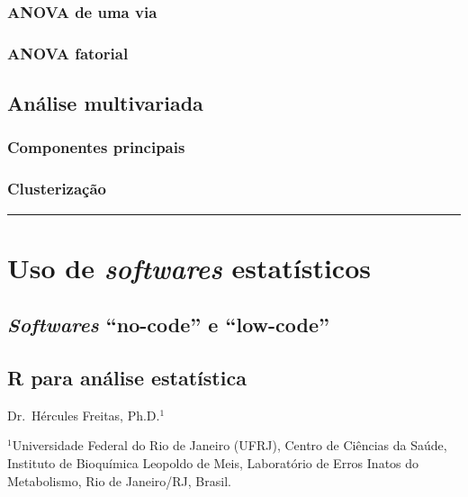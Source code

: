 \documentclass[
]{book}
\begin{document}
\subsection{ANOVA de uma via}\label{anova-de-uma-via}

\subsection{ANOVA fatorial}\label{anova-fatorial}

\section{Análise multivariada}\label{anuxe1lise-multivariada}

\subsection{Componentes principais}\label{componentes-principais}

\subsection{Clusterização}\label{clusterizauxe7uxe3o}

\begin{center}\rule{0.5\linewidth}{0.5pt}\end{center}

\chapter{\texorpdfstring{Uso de \emph{softwares} estatísticos}{Uso de softwares estatísticos}}\label{uso-de-softwares-estatuxedsticos}

\section{\texorpdfstring{\emph{Softwares} ``no-code'' e ``low-code''}{Softwares ``no-code'' e ``low-code''}}\label{softwares-no-code-e-low-code}

\section{R para análise estatística}\label{r-para-anuxe1lise-estatuxedstica}

Dr.~Hércules Freitas, Ph.D.\(^1\)

\(^1\)Universidade Federal do Rio de Janeiro (UFRJ), Centro de Ciências da Saúde, Instituto de Bioquímica Leopoldo de Meis, Laboratório de Erros Inatos do Metabolismo, Rio de Janeiro/RJ, Brasil.
\end{document}

